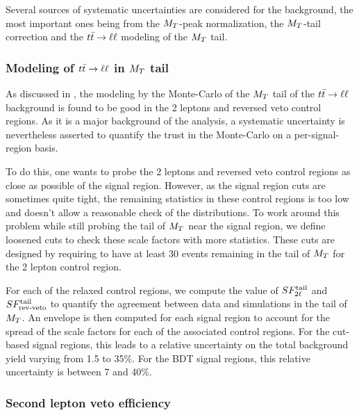             Several sources of systematic uncertainties are considered for the background,
            the most important ones being from the $M_T$-peak normalization, the $M_T$-tail
            correction and the $t\bar{t} \rightarrow \ell \ell$ modeling of the $M_T$ tail.

            \subsubsection{Modeling of $t\bar{t} \rightarrow \ell \ell$ in $M_T$ tail}

            As discussed in , the modeling by
            the Monte-Carlo of the $M_T$ tail of the $t\bar{t} \rightarrow \ell \ell$ background is found
            to be good in the 2 leptons and reversed veto control regions. As it is a
            major background of the analysis, a systematic uncertainty is nevertheless
            asserted to quantify the trust in the Monte-Carlo on a per-signal-region basis.

            To do this, one wants to probe the 2 leptons and reversed veto control regions
            as close as possible of the signal region. However, as the signal region cuts
            are sometimes quite tight, the remaining statistics in these control regions is
            too low and doesn't allow a reasonable check of the distributions. To work
            around this problem while still probing the tail of $M_T$ near the signal
            region, we define loosened cuts to check these scale factors with more
            statistics. These cuts are designed by requiring to have at least 30 events
            remaining in the tail of $M_T$ for the 2 lepton control region.

            For each of the relaxed control regions, we compute the value of $SF_{2\ell}^{\text{tail}}$
            and $SF_{\text{rev-veto}}^{\text{tail}}$ to quantify the agreement between data and simulations in
            the tail of $M_T$. An envelope is then computed for each signal
            region to account for the spread of the scale factors for each of the
            associated control regions. For the cut-based signal regions, this leads to a
            relative uncertainty on the total background yield varying from 1.5 to 35\%. For the
            BDT signal regions, this relative uncertainty is between 7 and 40\%.

            \subsubsection{Second lepton veto efficiency}

